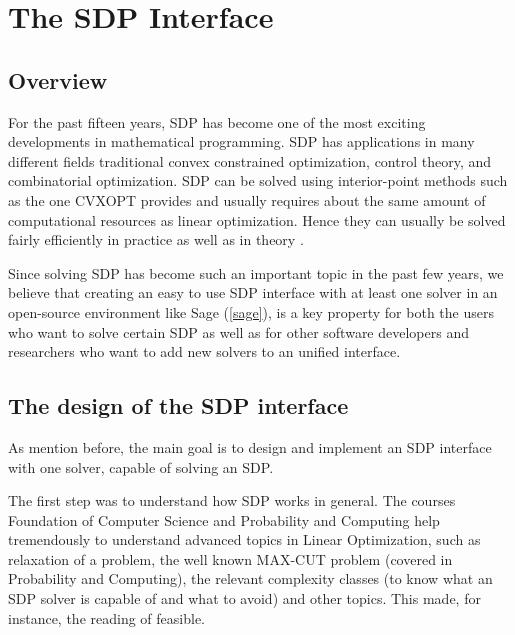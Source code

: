
\chapter{The SDP Interface} %

\label{Chapter3} %



\section{Overview}
For the past fifteen years, SDP has become one of the most exciting developments in mathematical programming. SDP has applications in many different fields traditional convex constrained optimization, control theory, and combinatorial optimization. SDP can be solved using interior-point methods such as the one CVXOPT provides and usually requires about the same amount of computational resources as linear optimization. Hence they can usually be solved fairly efficiently in practice as well as in theory \cite{introsdp}.

Since solving SDP has become such an important topic in the past few years, we believe that creating an easy to use SDP interface with at least one solver in an open-source environment like Sage (\ref{sage}), is a key property for both the users who want to solve certain SDP as well as for other software developers and researchers who want to add new solvers to an unified interface.  








\section{The design of the SDP interface}
\label{designsdp}
As mention before, the main goal is to design and implement an SDP interface with one solver, capable of solving an SDP.

The first step was to understand how SDP works in general. The courses Foundation of Computer Science and Probability and Computing help tremendously to understand advanced topics in Linear Optimization, such as relaxation of a problem, the well known  MAX-CUT problem (covered in Probability and Computing), the relevant complexity classes (to know  what an SDP solver is capable of and what to avoid) and other topics. This made, for instance, the reading of \cite{yellowbook} feasible. 
 
